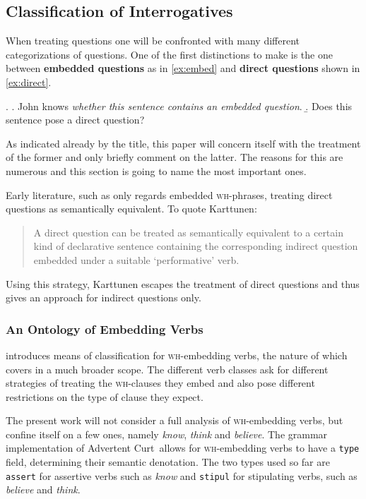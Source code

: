 \documentclass[12pt,a4paper]{article}
\newcommand{\term}[1]{\textsf{\textbf{#1}}} %
\newcommand{\code}{\texttt} %
\newcommand{\pn}{\textsf} %
\newcommand{\example}{\textit} %
\newcommand{\wh}{\textsc{wh}} %
\newcommand{\acurt}{\pn{Advertent Curt}\mbox{ }}
\theoremstyle{remark} \newtheorem*{termin}{Terminology} %
\begin{document}
\subsection{Classification of Interrogatives}

When treating questions one will be confronted with many different
categorizations of questions. One of the first distinctions to make is the one
between \term{embedded questions} as in \ref{ex:embed} and \term{direct
questions} shown in \ref{ex:direct}.

\ex. \a. John knows \emph{whether this sentence contains an embedded
question}.\label{ex:embed}
\b. Does this sentence pose a direct question?\label{ex:direct}

As indicated already by the title, this paper will concern itself with the
treatment of the former and only briefly comment on the latter. The reasons for
this are numerous  %
and this section is going to name the most important ones.

Early literature, such as \cite{karttunen:1977} only regards embedded
\wh-phrases, treating direct questions as semantically equivalent. To quote
Karttunen:

\begin{quote}A direct question can be treated as semantically equivalent to a
certain kind of declarative sentence containing the corresponding indirect
question embedded under  a suitable `performative' verb.\end{quote}

Using this strategy, Karttunen escapes the treatment of direct  questions and
thus gives an approach for indirect questions only.

\subsubsection{An Ontology of Embedding Verbs}

\cite{karttunen:1977} introduces means of classification for \wh-embedding
verbs, the nature of which \cite{lahiri:diss} covers in a much broader scope.
The different verb classes ask for different strategies of treating the
\wh-clauses they embed and also pose different restrictions on the type of
clause they expect.

The present work will not consider a full analysis of \wh-embedding verbs, but
confine itself on a few ones, namely \example{know}, \example{think} and
\example{believe}. The grammar implementation of \acurt allows for \wh-embedding
verbs to have a \code{type} field, determining their semantic denotation. The two
types used so far are \code{assert} for assertive verbs such as \example{know}
and \code{stipul} for stipulating verbs, such as \example{believe} and
\example{think}.
\end{document}
